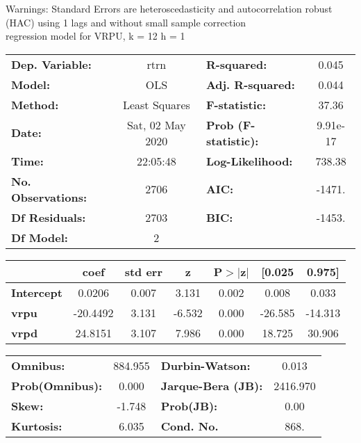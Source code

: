 Warnings: \newline
 [1] Standard Errors are heteroscedasticity and autocorrelation robust (HAC) using 1 lags and without small sample correction\\ 

regression model for VRPU, k = 12 h = 1\begin{center}
\begin{tabular}{lclc}
\toprule
\textbf{Dep. Variable:}    &       rtrn       & \textbf{  R-squared:         } &     0.045   \\
\textbf{Model:}            &       OLS        & \textbf{  Adj. R-squared:    } &     0.044   \\
\textbf{Method:}           &  Least Squares   & \textbf{  F-statistic:       } &     37.36   \\
\textbf{Date:}             & Sat, 02 May 2020 & \textbf{  Prob (F-statistic):} &  9.91e-17   \\
\textbf{Time:}             &     22:05:48     & \textbf{  Log-Likelihood:    } &    738.38   \\
\textbf{No. Observations:} &        2706      & \textbf{  AIC:               } &    -1471.   \\
\textbf{Df Residuals:}     &        2703      & \textbf{  BIC:               } &    -1453.   \\
\textbf{Df Model:}         &           2      & \textbf{                     } &             \\
\bottomrule
\end{tabular}
\begin{tabular}{lcccccc}
                   & \textbf{coef} & \textbf{std err} & \textbf{z} & \textbf{P$> |$z$|$} & \textbf{[0.025} & \textbf{0.975]}  \\
\midrule
\textbf{Intercept} &       0.0206  &        0.007     &     3.131  &         0.002        &        0.008    &        0.033     \\
\textbf{vrpu}      &     -20.4492  &        3.131     &    -6.532  &         0.000        &      -26.585    &      -14.313     \\
\textbf{vrpd}      &      24.8151  &        3.107     &     7.986  &         0.000        &       18.725    &       30.906     \\
\bottomrule
\end{tabular}
\begin{tabular}{lclc}
\textbf{Omnibus:}       & 884.955 & \textbf{  Durbin-Watson:     } &    0.013  \\
\textbf{Prob(Omnibus):} &   0.000 & \textbf{  Jarque-Bera (JB):  } & 2416.970  \\
\textbf{Skew:}          &  -1.748 & \textbf{  Prob(JB):          } &     0.00  \\
\textbf{Kurtosis:}      &   6.035 & \textbf{  Cond. No.          } &     868.  \\
\bottomrule
\end{tabular}
\end{center}

